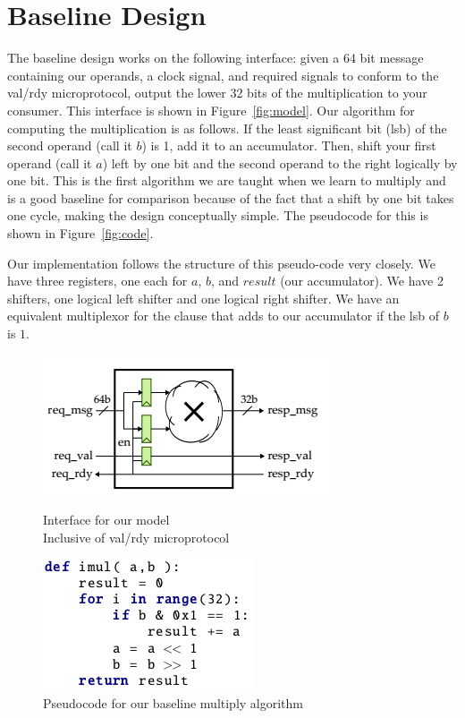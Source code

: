 \documentclass[10pt]{article}
\begin{document}
\section{Baseline Design}

The baseline design works on the following interface: 
given a 64 bit message containing our operands, a clock signal,
and required signals to conform to the val/rdy microprotocol,
output the lower 32 bits of the multiplication to your consumer.
This interface is shown in Figure~\ref{fig:model}.
Our algorithm for computing the multiplication is as follows.
If the least significant bit (lsb) of the second operand (call it $b$) is 1, add it to an accumulator.
Then, shift your first operand (call it $a$) left by one bit and the second operand to the right logically by one bit.
This is the first algorithm we are taught when we learn to multiply and is a good baseline for comparison because of the fact that a shift by one bit takes one cycle, making the design conceptually simple.
The pseudocode for this is shown in Figure~\ref{fig:code}. 

Our implementation follows the structure of this pseudo-code very closely.
We have three registers, one each for $a$, $b$, and $result$ (our accumulator).
We have 2 shifters, one logical left shifter and one logical right shifter. 
We have an equivalent multiplexor for the clause that adds to our accumulator if the lsb of $b$ is $1$.

\begin{figure}[b]
    \centering
    \begin{minipage}{.5\textwidth}
        \includegraphics[scale=0.6]{FLmodel} %
        \caption{Interface for our model\\
        Inclusive of val/rdy microprotocol}
        \label{fig:model}
   \end{minipage}%
\begin{minipage}{.5\textwidth}
    \centering
    \includegraphics[scale=0.55]{imul}
    \caption{Pseudocode for our baseline multiply algorithm}
    \label{fig:code}
    \end{minipage}
\label{fig:test}
\end{figure}
\end{document}
